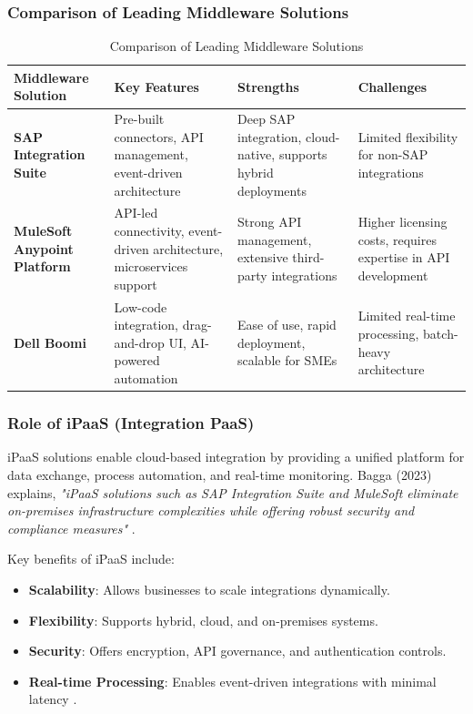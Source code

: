 \subsubsection{Comparison of Leading Middleware Solutions}

\begin{table}[h]
\centering
\small %
\begin{tabularx}{\textwidth}{|l|X|X|X|} %
\hline
\textbf{Middleware Solution} & \textbf{Key Features} & \textbf{Strengths} & \textbf{Challenges} \\
\hline
\textbf{SAP Integration Suite} & Pre-built connectors, API management, event-driven architecture & Deep SAP integration, cloud-native, supports hybrid deployments & Limited flexibility for non-SAP integrations \cite{bagga2023} \\
\hline
\textbf{MuleSoft Anypoint Platform} & API-led connectivity, event-driven architecture, microservices support & Strong API management, extensive third-party integrations & Higher licensing costs, requires expertise in API development \cite{sap2020} \\
\hline
\textbf{Dell Boomi} & Low-code integration, drag-and-drop UI, AI-powered automation & Ease of use, rapid deployment, scalable for SMEs & Limited real-time processing, batch-heavy architecture \cite{sap2020} \\
\hline
\end{tabularx}
\caption{Comparison of Leading Middleware Solutions}
\label{tab:middleware_comparison}
\end{table}

\subsubsection{Role of iPaaS (Integration PaaS)}
iPaaS solutions enable cloud-based integration by providing a unified platform for data exchange, process automation, and real-time monitoring. Bagga (2023) explains, \textit{"iPaaS solutions such as SAP Integration Suite and MuleSoft eliminate on-premises infrastructure complexities while offering robust security and compliance measures"} \cite{bagga2023}.

Key benefits of iPaaS include:
\begin{itemize}
\item \textbf{Scalability}: Allows businesses to scale integrations dynamically.
\item \textbf{Flexibility}: Supports hybrid, cloud, and on-premises systems.
\item \textbf{Security}: Offers encryption, API governance, and authentication controls.
\item \textbf{Real-time Processing}: Enables event-driven integrations with minimal latency \cite{sap2020}.
\end{itemize}

